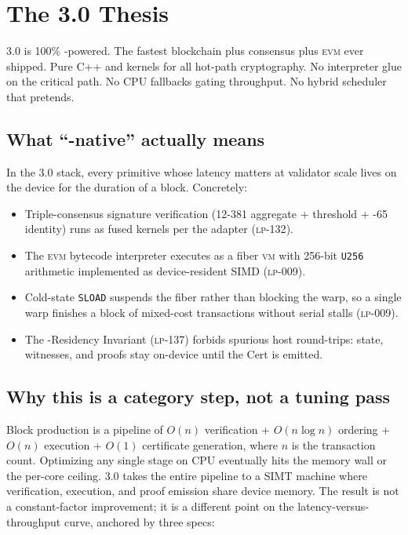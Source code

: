 \section{The 3.0 Thesis}
\label{sec:thesis}

\Zoo{} 3.0 is 100\% \GPU{}-powered. The fastest blockchain plus consensus plus
\textsc{evm} ever shipped. Pure C++ and \GPU{} kernels for all hot-path
cryptography. No interpreter glue on the critical path. No CPU fallbacks
gating throughput. No hybrid scheduler that pretends.

\subsection{What ``\GPU{}-native'' actually means}

In the \Zoo{} 3.0 stack, every primitive whose latency matters at validator
scale lives on the \GPU{} device for the duration of a block. Concretely:

\begin{itemize}[leftmargin=1.2em]
  \item Triple-consensus signature verification (\BLS{}12-381 aggregate +
        \Corona{} threshold + \MLDSA{}-65 identity) runs as fused
        \GPU{} kernels per the \QuasarGPU{} adapter (\textsc{lp-132}).
  \item The \textsc{evm} bytecode interpreter executes as a fiber
        \textsc{vm} with 256-bit \texttt{U256} arithmetic implemented as
        device-resident SIMD (\textsc{lp-009}).
  \item Cold-state \texttt{SLOAD} suspends the fiber rather than blocking the
        warp, so a single warp finishes a block of mixed-cost transactions
        without serial stalls (\textsc{lp-009}).
  \item The \GPU{}-Residency Invariant (\textsc{lp-137}) forbids spurious
        host round-trips: state, witnesses, and proofs stay on-device until
        the \Quasar{}Cert is emitted.
\end{itemize}

\subsection{Why this is a category step, not a tuning pass}

Block production is a pipeline of $O(n)$ verification + $O(n \log n)$
ordering + $O(n)$ execution + $O(1)$ certificate generation, where $n$ is
the transaction count. Optimizing any single stage on CPU eventually hits
the memory wall or the per-core ceiling. \Zoo{} 3.0 takes the entire
pipeline to a SIMT machine where verification, execution, and proof
emission share device memory. The result is not a constant-factor
improvement; it is a different point on the latency-versus-throughput
curve, anchored by three specs:

